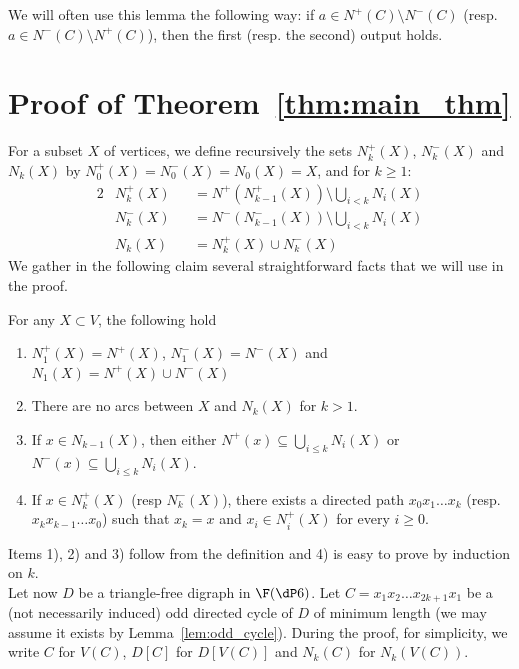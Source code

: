 We will often use this lemma the following way: if $a\in N^+(C)\setminus N^-(C)$ (resp. $a\in N^-(C)\setminus N^+(C)$), then the first (resp. the second) output holds.  






\section{Proof of Theorem~\ref{thm:main_thm}}
For a subset $X$ of vertices, we define recursively the sets $N_k^+(X)$, $N_k^{-}(X)$ and $N_k(X)$ by $N_{0}^+(X)=N_{0}^-(X)=N_0(X)=X$, and for $k\geq 1$:
\begin{alignat*}{2}
&N_{k}^+(X)&&=N^+(N_{k-1}^+(X))\setminus \bigcup_{i<k} N_i(X) \\
&N_{k}^-(X)&&=N^-(N_{k-1}^-(X))\setminus \bigcup_{i<k} N_i(X) \\
&N_{k}(X)&&=N_{k}^+(X)\cup N_k^-(X)
\end{alignat*}
We gather in the following claim several straightforward facts that we will use in the proof.
\begin{claim}\label{clm:basicsets} For any $X\subset V$, the following hold
\begin{enumerate}
    \item\label{it:1} $N^{+}_1(X) = N^+(X)$, $N^{-}_1(X) = N^-(X)$ and $N_1(X) = N^+(X)\cup N^-(X)$
    \item\label{it:2} There are no arcs between $X$ and  $N_k(X)$ for $k>1$.
    \item\label{it:3} If $x\in N_{k-1}(X)$, then either $N^+(x)\subseteq \bigcup_{i\leq k} N_i(X)$ or $N^-(x)\subseteq \bigcup_{i\leq k} N_i(X)$.  
 
    \item\label{it:4} If $x\in N_{k}^+(X)$ (resp $ N_{k}^-(X)$), there exists a directed path $x_0x_1\ldots x_k$ (resp. $x_kx_{k-1}\ldots x_0$)  such that $x_k=x$ and $x_i\in N_{i}^+(X)$ for every $i\geq 0$.
    
\end{enumerate}
\end{claim}
Items 1), 2) and 3) follow from the definition and 4) is easy to prove by induction on $k$.\\


Let now $D$ be a triangle-free digraph in $\F(\dP6)$. 
Let $C=x_1x_2\dots x_{2k+1}x_1$ be a  (not necessarily induced) odd directed cycle of $D$ of minimum length (we may assume it exists by Lemma~\ref{lem:odd_cycle}). 
During the proof, for simplicity, we write $C$ for $V(C)$, $D[C]$ for $D[V(C)]$ and $N_{k}(C)$ for $N_{k}(V(C))$. 


